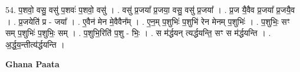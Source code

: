 \documentclass[17pt]{extarticle}
\begin{document}
54. प॒शवो॒ वसु॒ वसु॑ प॒शवः॑ प॒शवो॒ वसु॑ । . वसु॑ प्र॒जया᳚ प्र॒जया॒ वसु॒ वसु॑ प्र॒जया᳚ । . प्र॒ज यै॒वैव प्र॒जया᳚ प्र॒जयै॒व । . प्र॒जयेति॑ प्र - जया᳚ । . ए॒वैन॑ मेन मे॒वैवैन᳚म् । . ए॒न॒म् प॒शुभिः॑ प॒शुभि॑ रेन मेनम् प॒शुभिः॑ । . प॒शुभिः॒ सꣳ सम् प॒शुभिः॑ प॒शुभिः॒ सम् । . प॒शुभि॒रिति॑ प॒शु - भिः॒ । . स म॑र्द्धयन् त्यर्द्धयन्ति॒ सꣳ स म॑र्द्धयन्ति । . अ॒र्द्ध॒य॒न्तीत्य॑र्द्धयन्ति । \newline

\textbf{Ghana Paata } \newline
\end{document}

